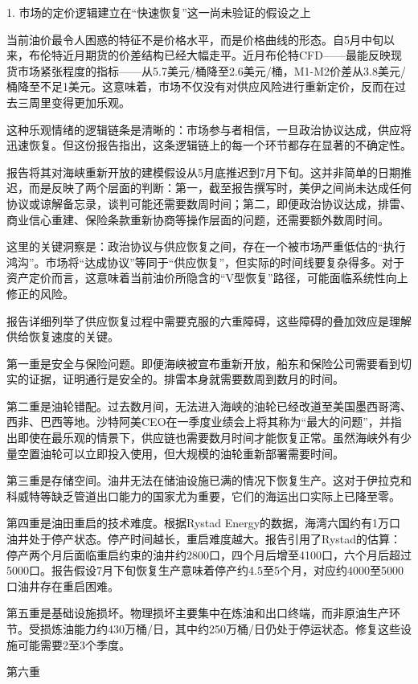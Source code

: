 \documentclass[11pt]{ctexart}
\begin{document}
1. 市场的定价逻辑建立在“快速恢复”这一尚未验证的假设之上

当前油价最令人困惑的特征不是价格水平，而是价格曲线的形态。自5月中旬以来，布伦特近月期货的价差结构已经大幅走平。近月布伦特CFD——最能反映现货市场紧张程度的指标——从5.7美元/桶降至2.6美元/桶，M1-M2价差从3.8美元/桶降至不足1美元。这意味着，市场不仅没有对供应风险进行重新定价，反而在过去三周里变得更加乐观。

这种乐观情绪的逻辑链条是清晰的：市场参与者相信，一旦政治协议达成，供应将迅速恢复。但这份报告指出，这条逻辑链上的每一个环节都存在显著的不确定性。

报告将其对海峡重新开放的建模假设从5月底推迟到7月下旬。这并非简单的日期推迟，而是反映了两个层面的判断：第一，截至报告撰写时，美伊之间尚未达成任何协议或谅解备忘录，谈判可能还需要数周时间；第二，即便政治协议达成，排雷、商业信心重建、保险条款重新协商等操作层面的问题，还需要额外数周时间。

这里的关键洞察是：政治协议与供应恢复之间，存在一个被市场严重低估的“执行鸿沟”。市场将“达成协议”等同于“供应恢复”，但实际的时间线要复杂得多。对于资产定价而言，这意味着当前油价所隐含的“V型恢复”路径，可能面临系统性向上修正的风险。

报告详细列举了供应恢复过程中需要克服的六重障碍，这些障碍的叠加效应是理解供给恢复速度的关键。

第一重是安全与保险问题。即便海峡被宣布重新开放，船东和保险公司需要看到切实的证据，证明通行是安全的。排雷本身就需要数周到数月的时间。

第二重是油轮错配。过去数月间，无法进入海峡的油轮已经改道至美国墨西哥湾、西非、巴西等地。沙特阿美CEO在一季度业绩会上将其称为“最大的问题”，并指出即使在最乐观的情景下，供应链也需要数月时间才能恢复正常。虽然海峡外有少量空置油轮可以立即投入使用，但大规模的油轮重新部署需要时间。

第三重是存储空间。油井无法在储油设施已满的情况下恢复生产。这对于伊拉克和科威特等缺乏管道出口能力的国家尤为重要，它们的海运出口实际上已降至零。

第四重是油田重启的技术难度。根据Rystad Energy的数据，海湾六国约有1万口油井处于停产状态。停产时间越长，重启难度越大。报告引用了Rystad的估算：停产两个月后面临重启约束的油井约2800口，四个月后增至4100口，六个月后超过5000口。报告假设7月下旬恢复生产意味着停产约4.5至5个月，对应约4000至5000口油井存在重启困难。

第五重是基础设施损坏。物理损坏主要集中在炼油和出口终端，而非原油生产环节。受损炼油能力约430万桶/日，其中约250万桶/日仍处于停运状态。修复这些设施可能需要2至3个季度。

第六重
\end{document}
